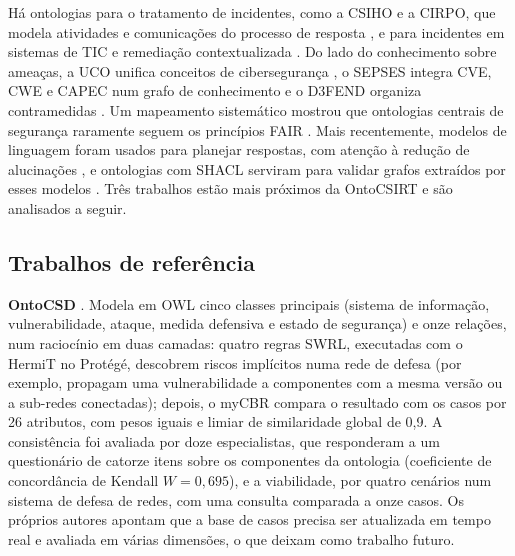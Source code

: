 \documentclass[12pt]{article}
\begin{document}
Há ontologias para o tratamento de incidentes, como a CSIHO \cite{moreira2018csiho} e a CIRPO, que modela atividades e comunicações do processo de resposta \cite{galadima2026cirpo}, e para incidentes em sistemas de TIC e remediação contextualizada \cite{tailhardat2024noria,kanawati2026}. Do lado do conhecimento sobre ameaças, a UCO unifica conceitos de cibersegurança \cite{syed2016uco}, o SEPSES integra CVE, CWE e CAPEC num grafo de conhecimento \cite{kiesling2019} e o D3FEND organiza contramedidas \cite{kaloroumakis2021d3fend}. Um mapeamento sistemático mostrou que ontologias centrais de segurança raramente seguem os princípios FAIR \cite{oliveira2021fair}. Mais recentemente, modelos de linguagem foram usados para planejar respostas, com atenção à redução de alucinações \cite{hammar2026}, e ontologias com SHACL serviram para validar grafos extraídos por esses modelos \cite{cotti2026ontologx}. Três trabalhos estão mais próximos da OntoCSIRT e são analisados a seguir.

\subsection{Trabalhos de referência}

\textbf{OntoCSD} \cite{wu2024ontocsd}. Modela em OWL cinco classes principais (sistema de informação, vulnerabilidade, ataque, medida defensiva e estado de segurança) e onze relações, num raciocínio em duas camadas: quatro regras SWRL, executadas com o HermiT no Protégé, descobrem riscos implícitos numa rede de defesa (por exemplo, propagam uma vulnerabilidade a componentes com a mesma versão ou a sub-redes conectadas); depois, o myCBR compara o resultado com os casos por 26 atributos, com pesos iguais e limiar de similaridade global de 0,9. A consistência foi avaliada por doze especialistas, que responderam a um questionário de catorze itens sobre os componentes da ontologia (coeficiente de concordância de Kendall $W=0{,}695$), e a viabilidade, por quatro cenários num sistema de defesa de redes, com uma consulta comparada a onze casos. Os próprios autores apontam que a base de casos precisa ser atualizada em tempo real e avaliada em várias dimensões, o que deixam como trabalho futuro.
\end{document}
